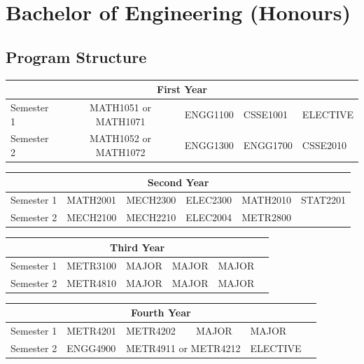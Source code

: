 \documentclass[a4paper,12pt]{report}
\begin{document}
\section{Bachelor of Engineering (Honours)}
\subsection{Program Structure}
\renewcommand{\arraystretch}{1.5}
\begin{table}[H]
    \centering
    \begin{tabular}{| m{6em} | m{5em} m{5em} m{5em} m{5em} m{5em} |}
        \hline
        \multicolumn{6}{|c|}{\bfseries First Year} \\
        \hline
        Semester 1 & \multicolumn{2}{c}{MATH1051 or MATH1071} & ENGG1100 & CSSE1001 & ELECTIVE \\
        Semester 2 & \multicolumn{2}{c}{MATH1052 or MATH1072} & ENGG1300 & ENGG1700 & CSSE2010 \\
        \hline
    \end{tabular}
\end{table}
\begin{table}[H]
    \centering
    \begin{tabular}{| m{6em} | m{5em} m{5em} m{5em} m{5em} m{5em} |}
        \hline
        \multicolumn{6}{|c|}{\bfseries Second Year} \\
        \hline
        Semester 1 & MATH2001 & MECH2300 & ELEC2300 & MATH2010 & STAT2201 \\
        Semester 2 & MECH2100 & MECH2210 & ELEC2004 & METR2800 & \\
        \hline
    \end{tabular}
\end{table}
\begin{table}[H]
    \centering
    \begin{tabular}{| m{6em} | m{5em} m{5em} m{5em} m{5em} m{5em} |}
        \hline
        \multicolumn{6}{|c|}{\bfseries Third Year} \\
        \hline
        Semester 1 & METR3100 & MAJOR & MAJOR & MAJOR & \\
        Semester 2 & METR4810 & MAJOR & MAJOR & MAJOR & \\
        \hline
    \end{tabular}
\end{table}
\begin{table}[H]
    \centering
    \begin{tabular}{| m{6em} | m{5em} m{5em} m{5em} m{5em} m{5em} |}
        \hline
        \multicolumn{6}{|c|}{\bfseries Fourth Year} \\
        \hline
        Semester 1 & METR4201 & METR4202 & MAJOR & MAJOR & \\
        Semester 2 & ENGG4900 & \multicolumn{2}{c}{METR4911 or METR4212} & ELECTIVE & \\
        \hline
    \end{tabular}
\end{table}
\renewcommand{\arraystretch}{1}
\end{document}

